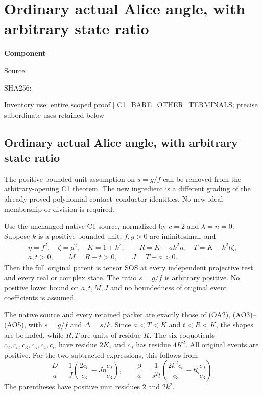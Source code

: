 \chapter{Ordinary actual Alice angle, with arbitrary state ratio}
\label{component:p9f00f949fc8c}
\noindent\textbf{Component }\par
{\small\noindent Source: \par}
{\small\noindent SHA256: \par}
{\small\noindent Inventory use: entire scoped proof | C1\_\allowbreak{}BARE\_\allowbreak{}OTHER\_\allowbreak{}TERMINALS; precise subordinate uses retained below\par}
\medskip
\section{Ordinary actual Alice angle, with arbitrary state ratio}
\label{p9f00f949fc8c:sec:c1-arbitrary-state-ratio}

The positive bounded-unit assumption on $s=g/f$ can be removed from
the arbitrary-opening C1 theorem. The new ingredient is a different
grading of the already proved polynomial contact--conductor identities.
No new ideal membership or division is required.

\begin{theorem}
Use the unchanged native C1 source, normalized by $c=2$ and
$\lambda=n=0$. Suppose $k$ is a positive bounded unit, $f,g>0$ are
infinitesimal, and
\[
 \begin{gathered}
 \eta=f^2,\quad\zeta=g^2,\quad K=1+k^2,\qquad
 R=K-ak^2\eta,\quad T=K-k^2t\zeta,\\
 a,t>0,\qquad M=R-t>0,\qquad J=T-a>0.
 \end{gathered}
 \tag{AS1}
\]
Then the full original parent is tensor SOS at every independent
projective test and every real or complex state. The ratio $s=g/f$
is arbitrary positive. No positive lower bound on $a,t,M,J$ and no
boundedness of original event coefficients is assumed.
\end{theorem}

The native source and every retained packet are exactly those of
(OA2), (AO3)--(AO5), with $s=g/f$ and $\Delta=s/k$. Since
$a<T<K$ and $t<R<K$, the shapes are bounded, while $R,T$ are units
of residue $K$. The six coquotients $c_2,c_b,c_3,c_5,c_4,c_\alpha$
have residue $2K$, and $c_d$ has residue $4K^2$.
All original events are positive. For the two subtracted expressions,
this follows from
\[
 \frac Da=\frac1J\left(\frac{2c_5}{c_3}
                   -J\eta\frac{c_d}{c_3}\right),\qquad
 \frac\beta a=\frac1{s^2t}
      \left(\frac{2k^2c_b}{c_3}-t\zeta\frac{c_d}{c_3}\right).
 \tag{AS2}
\]
The parentheses have positive unit residues $2$ and $2k^2$.

